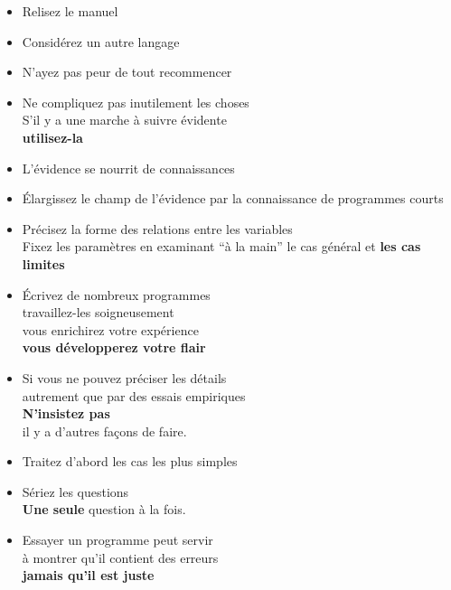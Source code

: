 {\begin{multicols}{2}
\begin{description}
\begin{itemize}
\item Relisez le manuel

\item Consid\'erez un autre langage

\item N'ayez pas peur de tout recommencer

\end{itemize}

\end{description}



\begin{itemize} 
\item Ne compliquez pas inutilement les choses\\
	  S'il y a une marche \`a suivre \'evidente\\
	  {\bf utilisez-la}

\item L'\'evidence se nourrit de connaissances

\item \'Elargissez le champ de l'\'evidence par la connaissance de programmes
courts

\item Pr\'ecisez la forme des relations entre les variables\\
	  Fixez les param\`etres en examinant ``\`a la main'' le cas g\'en\'eral et {\bf
	  les cas limites}

\item \'Ecrivez de nombreux programmes\\
	  travaillez-les soigneusement\\
	  vous enrichirez votre exp\'erience \\
	  {\bf vous d\'evelopperez votre flair}

\item Si vous ne pouvez pr\'eciser les d\'etails\\
	  autrement que par des essais empiriques\\
	  {\bf N'insistez pas}\\
	  il y a d'autres fa\c cons de faire.

\item Traitez d'abord les cas les plus simples

\item S\'eriez les questions\\
	  {\bf Une seule} question \`a la fois.

\item Essayer un programme peut servir \\
	  \`a montrer qu'il contient des erreurs\\
	  {\bf jamais qu'il est juste}


\end{itemize}
\end{multicols}}
